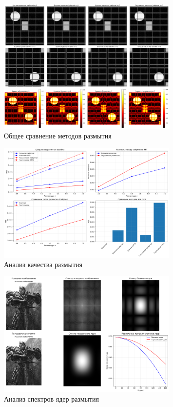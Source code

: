 \begin{figure}[H]
    \centering
    \includegraphics[width=0.8\textwidth]{images/task2/method_comparison.png}
    \caption{Общее сравнение методов размытия}
    \label{fig:method_comparison_blur}
\end{figure}

\begin{figure}[H]
    \centering
    \includegraphics[width=0.8\textwidth]{images/task2/quality_analysis.png}
    \caption{Анализ качества размытия}
    \label{fig:quality_analysis_blur}
\end{figure}

\begin{figure}[H]
    \centering
    \includegraphics[width=0.8\textwidth]{images/task2/spectrum_analysis.png}
    \caption{Анализ спектров ядер размытия}
    \label{fig:spectrum_analysis_blur}
\end{figure}

